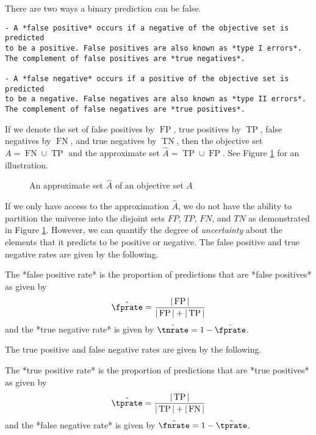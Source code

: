 \documentclass[
]{article}
\begin{document}
There are two ways a binary prediction can be false.

\begin{verbatim}
- A *false positive* occurs if a negative of the objective set is predicted
to be a positive. False positives are also known as *type I errors*.
The complement of false positives are *true negatives*.

- A *false negative* occurs if a positive of the objective set is predicted
to be a negative. False negatives are also known as *type II errors*.
The complement of false negatives are *true positives*.
\end{verbatim}

If we denote the set of false positives by \(\operatorname{FP}\), true
positives by \(\operatorname{TP}\), false negatives by
\(\operatorname{FN}\), and true negatives by \(\operatorname{TN}\), then
the objective set \(A=\operatorname{FN}\cup \operatorname{TP}\) and the
approximate set \(\hat{A}=\operatorname{TP}\cup \operatorname{FP}\). See
Figure \ref{fig:ex_approx_set} for an illustration.

\begin{figure}[ht]
    \caption{An approximate set $\hat{A}$ of an objective set $A$}
    \label{fig:ex_approx_set}
    \centering
    \def\svgwidth{\columnwidth/4}
    
\end{figure}

If we only have access to the approximation \(\hat{A}\), we do not have
the ability to partition the universe into the disjoint sets \(FP\),
\(TP\), \(FN\), and \(TN\) as demonstrated in Figure
\ref{fig:ex_approx_set}. However, we can quantify the degree of
\emph{uncertainty} about the elements that it predicts to be positive or
negative. The false positive and true negative rates are given by the
following.

\begin{definition}
\label{def:fprate}
The *false positive rate* is the proportion of predictions that are *false positives* as given by
$$
\hat{\fprate} = \frac{|\operatorname{FP}|}{|\operatorname{FP}| + |\operatorname{TP}|}
$$
and the *true negative rate* is given by $\hat{\tnrate} = 1 - \hat{\fprate}$.
\end{definition}

The true positive and false negative rates are given by the following.

\begin{definition}
The *true positive rate* is the proportion of predictions that are
*true positives* as given by
$$
\hat{\tprate} = \frac{|\operatorname{TP}|}{|\operatorname{TP}| + |\operatorname{FN}|}
$$
and the *false negative rate* is given by $\hat{\fnrate} = 1 - \hat{\tprate}$.
\end{definition}
\end{document}
